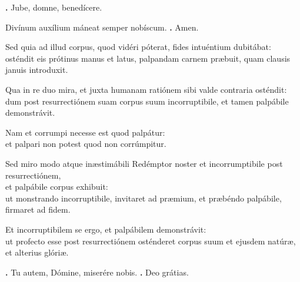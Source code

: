 \begin{small}
\textbf{\Vbar.} Jube, domne, benedícere.

Divínum auxílium máneat semper nobíscum. \textbf{\Rbar.} Amen.
\end{small}


Sed quia ad illud corpus, quod vidéri póterat, fides intuéntium dubitábat: \\
osténdit eis prótinus manus et latus, palpandam carnem præbuit, quam clausis januis introduxit. 

Qua in re duo mira, et juxta humanam ratiónem sibi valde contraria osténdit: \\
dum post resurrectiónem suam corpus suum incorruptibile, et tamen palpábile demonstrávit. 

Nam et corrumpi necesse est quod palpátur: \\
et palpari non potest quod non corrúmpitur. 

Sed miro modo atque inæstimábili Redémptor noster et incorrumptibile post resurrectiónem, \\
et palpábile corpus exhibuit: \\
ut monstrando incorruptibile, invitaret ad præmium, et præbéndo palpábile, firmaret ad fidem. 

Et incorruptibilem se ergo, et palpábilem demonstrávit: \\
ut profecto esse post resurrectiónem osténderet corpus suum et ejusdem natúræ, et alterius glóriæ.

\textbf{\Vbar.} Tu autem, Dómine, miserére nobis.
\textbf{\Rbar.} Deo grátias.

